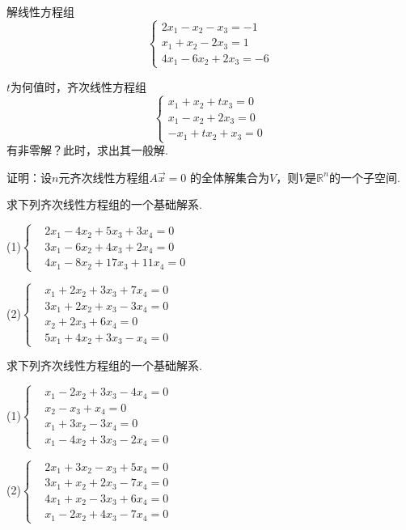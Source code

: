 \begin{ex}\label{5.4}
解线性方程组
\begin{equation*}
\begin{cases}
2x_1-x_2-x_3=-1\\
x_1+x_2-2x_3=1\\
4x_1-6x_2+2x_3=-6
\end{cases}
\end{equation*}
\end{ex}

\begin{ex}\label{5.5}
$t$为何值时，齐次线性方程组
\begin{equation*}
\begin{cases}
x_1+x_2+tx_3=0\\
x_1-x_2+2x_3=0\\
-x_1+tx_2+x_3=0
\end{cases}
\end{equation*}
有非零解？此时，求出其一般解.
\end{ex}

\begin{ex}\label{5.6}
证明：设$n$元齐次线性方程组$A\vec{x}=0$ 的全体解集合为$V$，则$V$是$\mathbb{R}^n$的一个子空间.
\end{ex}

\begin{ex}\label{5.7}
求下列齐次线性方程组的一个基础解系.

(1)$\left\{\begin{aligned}&2x_1-4x_2+5x_3+3x_4=0\\&3x_1-6x_2+4x_3+2x_4=0\\&4x_1-8x_2+17x_3+11x_4=0\end{aligned}
\right.$

(2)$\left\{\begin{aligned}& x_1+2x_2+3x_3+7x_4=0 \\&3x_1+2x_2+ x_3-3x_4=0 \\&     x_2+2x_3+6x_4=0 \\&5x_1+4x_2+3x_3- x_4=0     \end{aligned}\right.$
\end{ex}

\begin{ex}\label{5.8}
求下列齐次线性方程组的一个基础解系.

(1)$\left\{\begin{aligned}& x_1-2x_2+3x_3-4x_4=0 \\&       x _2- x_3+ x_4=0 \\&  x _1+3x_2      -3x_4=0 \\&x_1-4x_2+3x_3-2x_4=0     \end{aligned}\right.$

(2)$\left\{\begin{aligned}& 2x_1+3x_2- x_3+5x_4=0 \\&3x_1+ x_2+2x_3-7x_4=0 \\&4x_1+ x_2-3x_3+6x_4=0 \\& x_1-2x_2+4x_3-7x_4=0    \end{aligned}\right.$
\end{ex}

